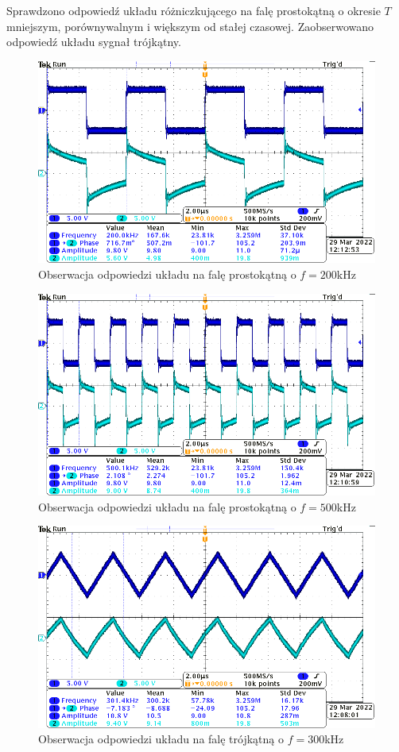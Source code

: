 \clearpage
\section{}
Sprawdzono odpowiedź układu różniczkującego na falę prostokątną o okresie \(T\) mniejszym, porównywalnym i większym od stałej czasowej.
Zaobserwowano odpowiedź układu sygnał trójkątny.

\begin{figure}[H]
	\centering
	\includegraphics[width=\textwidth]{include/2/200_sq.png}
	\caption{Obserwacja odpowiedzi układu na falę prostokątną o \(f=200\)kHz}
\end{figure}
\begin{figure}[H]
	\centering
	\includegraphics[width=\textwidth]{include/2/500_sq.png}
	\caption{Obserwacja odpowiedzi układu na falę prostokątną o \(f=500\)kHz}
\end{figure}
\begin{figure}[H]
	\centering
	\includegraphics[width=\textwidth]{include/2/nom_tr.png}
	\caption{Obserwacja odpowiedzi układu na falę trójkątną o \(f=300\)kHz}
\end{figure}
